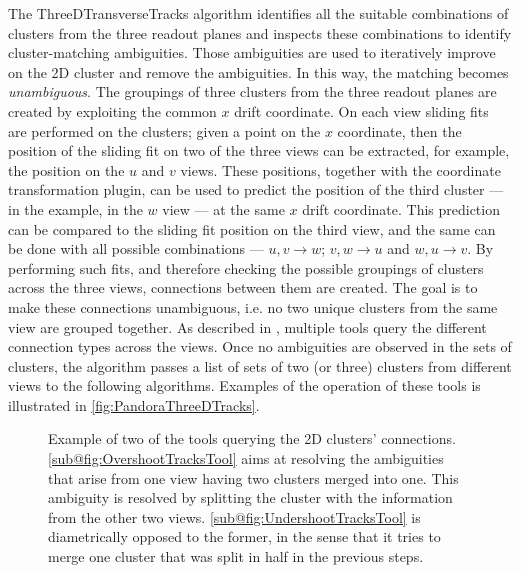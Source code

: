 The ThreeDTransverseTracks algorithm identifies all the suitable combinations of clusters from the three readout planes and inspects these combinations to identify cluster-matching ambiguities. Those ambiguities are used to iteratively improve on the 2D cluster and remove the ambiguities. In this way, the matching becomes \emph{unambiguous}. The groupings of three clusters from the three readout planes are created by exploiting the common $x$ drift coordinate. On each view sliding fits are performed on the clusters; given a point on the $x$ coordinate, then the position of the sliding fit on two of the three views can be extracted, for example, the position on the $u$ and $v$ views. These positions, together with the coordinate transformation plugin, can be used to predict the position of the third cluster --- in the example, in the $w$ view --- at the same $x$ drift coordinate. This prediction can be compared to the sliding fit position on the third view, and the same can be done with all possible combinations --- $u,v\to w$; $v,w\to u$ and $w, u \to v$. By performing such fits, and therefore checking the possible groupings of clusters across the three views, connections between them are created. The goal is to make these connections unambiguous, i.e. no two unique clusters from the same view are grouped together. As described in \cite{MicroBooNE:2017xvs}, multiple tools query the different connection types across the views. Once no ambiguities are observed in the sets of clusters, the algorithm passes a list of sets of two (or three) clusters from different views to the following algorithms. Examples of the operation of these tools is illustrated in \autoref{fig:PandoraThreeDTracks}. 

\begin{figure}
    \centering
    \caption[Three-dimensional reconstruction helper tools]{Example of two of the tools querying the 2D clusters' connections. \ref{sub@fig:OvershootTracksTool} aims at resolving the ambiguities that arise from one view having two clusters merged into one. This ambiguity is resolved by splitting the cluster with the information from the other two views. \ref{sub@fig:UndershootTracksTool} is diametrically opposed to the former, in the sense that it tries to merge one cluster that was split in half in the previous steps. }
    \label{fig:PandoraThreeDTracks}
\end{figure}

